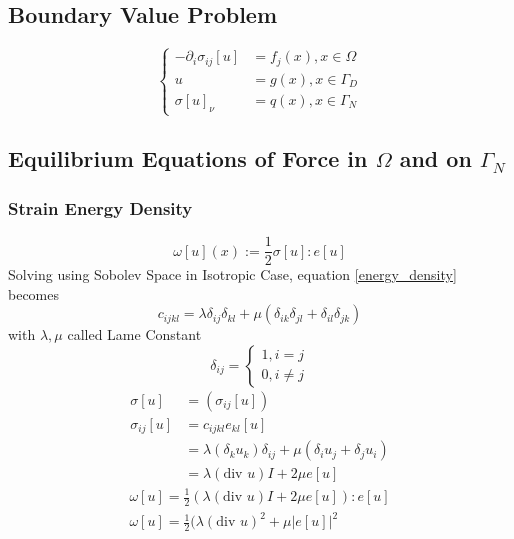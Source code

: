 \documentclass[a4paper,12pt]{article}
\begin{document}
\subsection{Boundary Value Problem}
\begin{equation}
\begin{cases}
-\partial_i \sigma_{ij}[u] &= f_j(x), x \in \Omega\\
u &= g(x), x \in \Gamma_D\\
\sigma[u]_\nu &= q(x), x \in \Gamma_N
\end{cases}
\end{equation}
\newpage
\subsection{Equilibrium Equations of Force in $\Omega$ and on $\Gamma_N$}
\subsubsection{Strain Energy Density}
\begin{equation}
\label{energy_density}
\omega[u](x) := \frac{1}{2} \sigma[u] : e[u]
\end{equation}
Solving using Sobolev Space in Isotropic Case, equation \ref{energy_density} becomes
\begin{equation}\nonumber
c_{ijkl} = \lambda \delta_{ij} \delta_{kl} + \mu(\delta_{ik} \delta_{jl} + \delta_{il} \delta_{jk})
\end{equation}
with $\lambda, \mu$ called Lame Constant
\begin{equation}\nonumber
\delta_{ij} = \begin{cases}
1, i = j\\
0, i \neq j
\end{cases}
\end{equation}
\begin{equation}\nonumber
\begin{aligned}
\sigma[u] &= (\sigma_{ij}[u])\\
\sigma_{ij}[u] &= c_{ijkl} e_{kl}[u]\\
&= \lambda(\delta_k u_k)\delta_{ij} + \mu(\delta_i u_j + \delta_j u_i)\\
&= \lambda(\text{div } u) I + 2\mu e[u]
\end{aligned}
\end{equation}
\begin{equation}\nonumber
\begin{aligned}
\omega[u] = \frac{1}{2} (\lambda(\text{div } u) I + 2\mu e[u]) : e[u]\\
\omega[u] = \frac{1}{2} (\lambda(\text{div } u)^2 + \mu |e[u]|^2\\
\end{aligned}
\end{equation}
\end{document}
